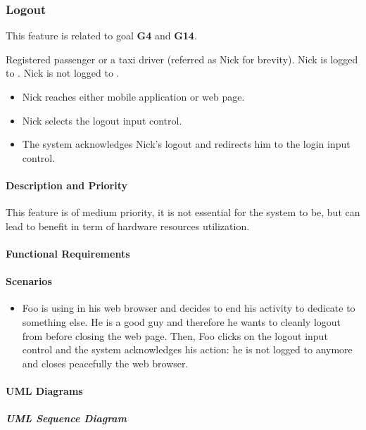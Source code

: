 \subsubsection{Logout}
This feature is related to goal \textbf{G4} and \textbf{G14}.
\begin{itemize}
	 Registered passenger or a taxi driver (referred as Nick for brevity).
	 Nick is logged to \myTaxiService{}.
	 Nick is not logged to \myTaxiService{}.
	\begin{itemize}
		\item Nick reaches either \myTaxiService{} mobile application or web page.
		\item Nick selects the logout input control.
		\item The system acknowledges Nick's logout and redirects him to the login input control.
	\end{itemize}
\end{itemize}
\paragraph{Description and Priority}
This feature is of medium priority, it is not essential for the system to be, but can lead to benefit in term of hardware resources utilization.\par
\paragraph{Functional Requirements}
\begin{itemize}
\end{itemize}
\paragraph{Scenarios}
\begin{itemize}
	\item Foo is using \myTaxiService{} in his web browser and decides to end his activity to dedicate to something else.
	He is a good guy and therefore he wants to cleanly logout from \myTaxiService{} before closing the web page.
	Then, Foo clicks on the logout input control and the system acknowledges his action: he is not logged to \myTaxiService{} anymore and closes peacefully the web browser.
\end{itemize}
\paragraph{UML Diagrams}
\subparagraph{UML Sequence Diagram}
